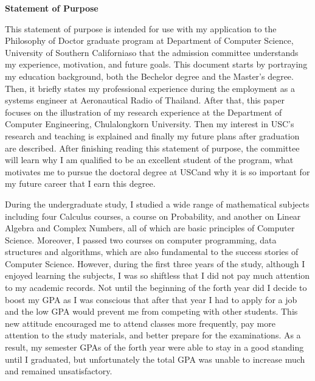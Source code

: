 \documentclass[a4paper]{report}
\newcommand{\university}{University of Southern California}
\newcommand{\department}{Department of Computer Science}
\newcommand{\uniabbre}{USC}
\begin{document}
\begin{center}
\textbf{\large Statement of Purpose}
\end{center}

\vspace{0.4cm}
This statement of purpose is intended for use with my application to the Philosophy of Doctor graduate program at \department, \university \space so that the admission committee understands my experience, motivation, and future goals. This document starts by portraying my education background, both the Bechelor degree and the Master's degree. Then, it briefly states my professional experience during the employment as a systems engineer at Aeronautical Radio of Thailand. After that, this paper focuses on the illustration of my research experience at the Department of Computer Engineering, Chulalongkorn University. Then my interest in \uniabbre's research and teaching is explained and finally my future plans after graduation are described. After finishing reading this statement of purpose, the committee will learn why I am qualified to be an excellent student of the program, what motivates me to pursue the doctoral degree at \uniabbre \space and why it is so important for my future career that I earn this degree.

\vspace{0.2cm}
During the undergraduate study, I studied a wide range of mathematical subjects including four Calculus courses, a course on Probability, and another on Linear Algebra and Complex Numbers, all of which are basic principles of Computer Science. Moreover, I passed two courses on computer programming, data structures and algorithms, which are also fundamental to the success stories of Computer Science. However, during the first three years of the study, although I enjoyed learning the subjects, I was so shiftless that I did not pay much attention to my academic records. Not until the beginning of the forth year did I decide to boost my GPA as I was conscious that after that year I had to apply for a job and the low GPA would prevent me from competing with other students. This new attitude encouraged me to attend classes more frequently, pay more attention to the study materials, and better prepare for the examinations. As a result, my semester GPAs of the forth year were able to stay in a good standing until I graduated, but unfortunately the total GPA was unable to increase much and remained unsatisfactory. 
\end{document}
